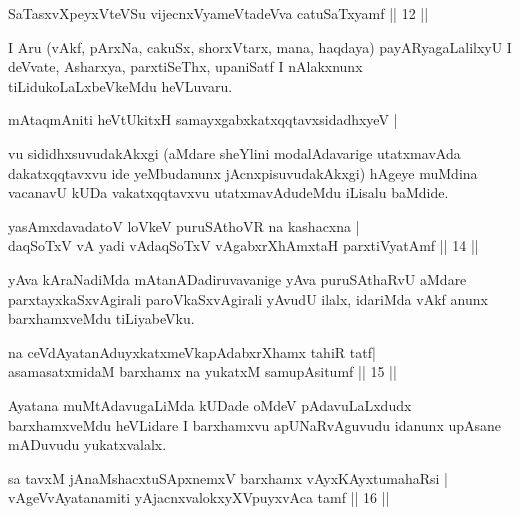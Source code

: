 
\begin{shl}
SaTasxvXpeyxVteVSu vijecnxVyameVtadeVva catuSaTxyamf \hfill || 12 || 
\end{shl}

\begin{artha}
I Aru (vAkf, pArxNa, cakuSx, shorxVtarx, mana, haqdaya) payARyagaLalilxyU I deVvate, Asharxya, parxtiSeThx, upaniSatf I nAlakxnunx tiLidukoLaLxbeVkeMdu heVLuvaru.
\end{artha}

\begin{shl}
mAtaqmAniti heVtUkitxH samayxgabxkatxqqtavxsidadhxyeV |\\
\end{shl}

\begin{artha}
vu sididhxsuvudakAkxgi (aMdare sheYlini modalAdavarige utatxmavAda dakatxqqtavxvu ide yeMbudanunx jAcnxpisuvudakAkxgi) hAgeye muMdina vacanavU kUDa vakatxqqtavxvu utatxmavAdudeMdu iLisalu baMdide.
\end{artha}

\begin{shl}
yasAmxdavadatoV loVkeV puruSAthoVR na kashacxna |\\
daqSoTxV vA yadi vA\s daqSoTxV vAgabxrXhAmxtaH parxtiVyatAmf \hfill || 14 || 
\end{shl}

\begin{artha}
yAva kAraNadiMda mAtanADadiruvavanige yAva puruSAthaRvU aMdare parxtayxkaSxvAgirali paroVkaSxvAgirali yAvudU ilalx, idariMda vAkf anunx barxhamxveMdu tiLiyabeVku.
\end{artha}

\begin{shl}
na ceVdAyatanAduyxkatxmeVkapAdabxrXhamx tahiR tatf|\\
asamasatxmidaM barxhamx na yukatxM samupAsitumf \hfill || 15 ||
\end{shl}

\begin{artha}
Ayatana muMtAdavugaLiMda kUDade oMdeV pAdavuLaLxdudx barxhamxveMdu heVLidare I barxhamxvu apUNaRvAguvudu idanunx upAsane mADuvudu yukatxvalalx.
\end{artha}

\begin{shl}
sa tavxM jAnaMshacxtuSApxnemxV barxhamx vAyxKAyxtumahaRsi |\\
vAgeVvA\s \s yatanamiti yAjacnxvalokxyXV\s puyxvAca tamf \hfill || 16 || 
\end{shl}

